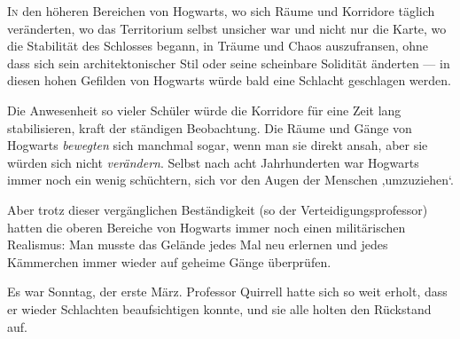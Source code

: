 
\lettrine{I}{n} den höheren Bereichen von Hogwarts, wo sich Räume und Korridore täglich veränderten, wo das Territorium selbst unsicher war und nicht nur die Karte, wo die Stabilität des Schlosses begann, in Träume und Chaos auszufransen, ohne dass sich sein architektonischer Stil oder seine scheinbare Solidität änderten — in diesen hohen Gefilden von Hogwarts würde bald eine Schlacht geschlagen werden.

Die Anwesenheit so vieler Schüler würde die Korridore für eine Zeit lang stabilisieren, kraft der ständigen Beobachtung. Die Räume und Gänge von Hogwarts \emph{bewegten} sich manchmal sogar, wenn man sie direkt ansah, aber sie würden sich nicht \emph{verändern}. Selbst nach acht Jahrhunderten war Hogwarts immer noch ein wenig schüchtern, sich vor den Augen der Menschen ‚umzuziehen‘.

Aber trotz dieser vergänglichen Beständigkeit (so der Verteidigungsprofessor) hatten die oberen Bereiche von Hogwarts immer noch einen militärischen Realismus: Man musste das Gelände jedes Mal neu erlernen und jedes Kämmerchen immer wieder auf geheime Gänge überprüfen.

Es war Sonntag, der erste März. Professor Quirrell hatte sich so weit erholt, dass er wieder Schlachten beaufsichtigen konnte, und sie alle holten den Rückstand auf.

